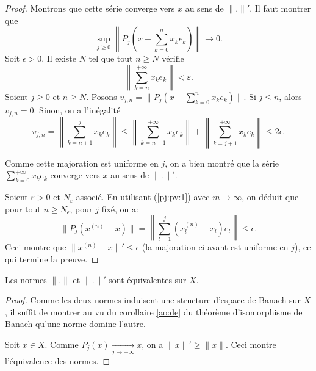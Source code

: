 \begin{proof}
  Montrons que cette série converge vers $x$ au sens de $\|.\|'$.
  Il faut montrer que
  $$\sup_{j\geq 0}\left\|P_j\left(x - \sum_{k=0}^nx_ke_k\right)\right\|\to 0.$$
  Soit $\epsilon > 0$. Il existe $N$ tel que tout $n\geq N$ vérifie
  $$\left\|\sum_{k=n}^{+\infty}x_ke_k\right\|< \varepsilon.$$
  Soient $j\geq 0$ et $n\geq N$. Posons
  $v_{j, n}= \|P_j(x - \sum_{k=0}^nx_ke_k)\|$. Si $j\leq n$, alors $v_{j, n}=0$.
  Sinon, on a l'inégalité
  $$ v_{j, n} =
  \left\|\sum_{k=n+1}^jx_ke_k\right\| \leq
  \left\|\sum_{k=n+1}^{+\infty}x_ke_k\right\| +
  \left\|\sum_{k=j+1}^{+\infty}x_ke_k\right\|\leq 2\epsilon.$$

  Comme cette majoration est uniforme en $j$, on a bien montré que la
  série $\sum_{k=0}^{+\infty}x_ke_k$ converge vers $x$ au sens de $\|.\|'$.

  Soient $\varepsilon > 0$ et $N_\varepsilon$ associé. En utilisant
  (\ref{pj:pv:1}) avec $m\to\infty$, on déduit que pour tout $n\geq N_\epsilon$,
  pour $j$ fixé, on a:
  $$ \|P_j(x^{(n)} - x)\| =
  \left\|\sum_{l = 1}^j(x^{(n)}_l-x_l)e_l\right\|
  \leq \epsilon.$$
  Ceci montre que $\|x^{(n)}-x\|'\leq \epsilon$ (la majoration ci-avant
  est uniforme en $j$), ce qui termine la preuve.
\end{proof}

\begin{cor}
  Les normes $\|.\|$ et $\|.\|'$ sont équivalentes sur $X$.
\end{cor}
\begin{proof}
  Comme les deux normes induisent une structure d'espace de Banach sur $X$,
  il suffit de montrer au vu du corollaire \ref{ao:de} du théorème
  d'isomorphisme de Banach qu'une norme domine l'autre.

  Soit $x\in X$. Comme $P_j(x)\xrightarrow[j\to+\infty]{}x$,
  on a $\|x\|'\geq \|x\|$. Ceci montre l'équivalence des normes.
\end{proof}

